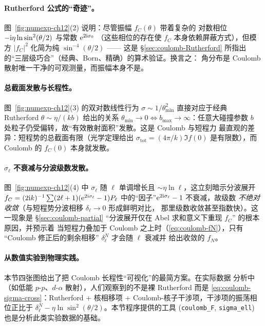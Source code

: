 \paragraph{Rutherford 公式的``奇迹''。}
图~\ref{fig:numexp-ch12}(2) 说明：尽管振幅 $f_C(\theta)$ 带着复杂的
对数相位 $-\mathrm{i}\eta\ln\sin^2(\theta/2)$ 与常数 $\mathrm{e}^{2\mathrm{i}\sigma_0}$
（这些相位的存在使 $f_C$ 本身依赖屏蔽方式），但模方 $|f_C|^2$
化简为纯 $\sin^{-4}(\theta/2)$ —— 这是 \S\ref{sec:coulomb-Rutherford}
所指出的``三层级巧合''（经典、Born、精确）的算术验证。换言之：
角分布是 Coulomb 散射唯一干净的可观测量，而振幅本身不是。

\paragraph{总截面发散与长程性。}
图~\ref{fig:numexp-ch12}(3) 的双对数线性行为 $\sigma\sim 1/\theta_{\min}^2$
直接对应于经典 Rutherford $\theta\sim\eta/(kb)$ 给出的关系
$\theta_{\min}\to 0\Leftrightarrow b_{\max}\to\infty$：任意大碰撞参数
$b$ 处粒子仍受偏转，故``有效散射面积''发散。这是 Coulomb 与短程力
最直观的差异：短程势的总截面有限（光学定理给出 $\sigma_{\mathrm{tot}}=
(4\pi/k)\Im f(0)$ 是有限数），而 Coulomb 的 $f_C(0)$ 本身就发散。

\paragraph{$\sigma_\ell$ 不衰减与分波级数发散。}
图~\ref{fig:numexp-ch12}(4) 中 $\sigma_\ell$ 随 $\ell$ 单调增长且
$\sim\eta\ln\ell$，这立刻暗示分波展开
$f_C=(2\mathrm{i} k)^{-1}\sum(2\ell+1)(\mathrm{e}^{2\mathrm{i}\sigma_\ell}-1)P_\ell$
中的``因子''$\mathrm{e}^{2\mathrm{i}\sigma_\ell}-1$ 不衰减，故级数
\emph{不绝对收敛}（与短程势分波相移 $\delta_\ell\to 0$ 形成鲜明对比，
那里级数收敛甚至指数快）。这一现象是 \S\ref{sec:coulomb-partial}
``分波展开仅在 Abel 求和意义下重现 $f_C$'' 的根本原因，并预示着
当短程力叠加于 Coulomb 之上时（\eqref{eq:coulomb-fN}），只有
``Coulomb 修正后的剩余相移'' $\delta_\ell^N$ 才会随 $\ell$ 衰减并
给出收敛的 $f_N$。

\paragraph{从数值实验到物理实践。}
本节四张图给出了把 Coulomb 长程性``可视化''的最简方案。在实际数据
分析中（如低能 $p$-$p$、$d$-$\alpha$ 散射），人们观察到的不是裸
Rutherford 而是 \eqref{eq:coulomb-sigma-cross}：Rutherford + 核相移项
+ Coulomb-核子干涉项，干涉项的振荡相位正比于
$\delta_\ell^N-\eta\ln\sin^2(\theta/2)$。本节程序提供的工具
(\texttt{coulomb\_F}, \texttt{sigma\_ell}) 也是分析此类实验数据的基础。

